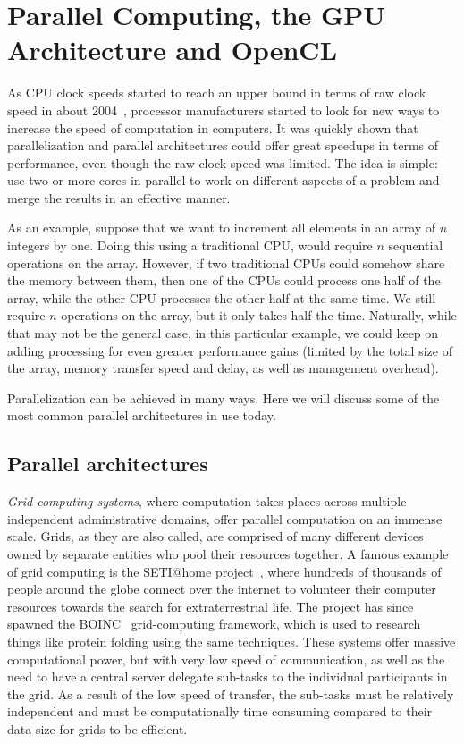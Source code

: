 \section{Parallel Computing, the GPU Architecture and OpenCL}

As CPU clock speeds started to reach an upper bound in terms of raw
clock speed in about 2004~\cite{clockspeed}, processor manufacturers
started to look for new ways to increase the speed of computation in
computers. It was quickly shown that parallelization and parallel
architectures could offer great speedups in terms of performance, even
though the raw clock speed was limited. The idea is simple: use two or
more cores in parallel to work on different aspects of a problem and
merge the results in an effective manner.

As an example, suppose that we want to increment all elements in an
array of $n$ integers by one. Doing this using a traditional CPU,
would require $n$ sequential operations on the array. However, if two
traditional CPUs could somehow share the memory between them, then one
of the CPUs could process one half of the array, while the other CPU
processes the other half at the same time. We still require $n$
operations on the array, but it only takes half the time. Naturally,
while that may not be the general case, in this particular example, we
could keep on adding processing for even greater performance gains
(limited by the total size of the array, memory transfer speed and
delay, as well as management overhead).

Parallelization can be achieved in many ways. Here we will discuss
some of the most common parallel architectures in use today.

\subsection{Parallel architectures}

\emph{Grid computing systems}, where computation takes places across
multiple independent administrative domains, offer parallel
computation on an immense scale. Grids, as they are also called, are
comprised of many different devices owned by separate entities who
pool their resources together. A famous example of grid computing is
the SETI@home project~\cite{seti}, where hundreds of thousands of
people around the globe connect over the internet to volunteer their
computer resources towards the search for extraterrestrial life. The
project has since spawned the BOINC~\cite{boinc-other} grid-computing
framework, which is used to research things like protein folding using
the same techniques. These systems offer massive computational power,
but with very low speed of communication, as well as the need to have
a central server delegate sub-tasks to the individual participants in
the grid. As a result of the low speed of transfer, the sub-tasks must
be relatively independent and must be computationally time consuming
compared to their data-size for grids to be efficient.

